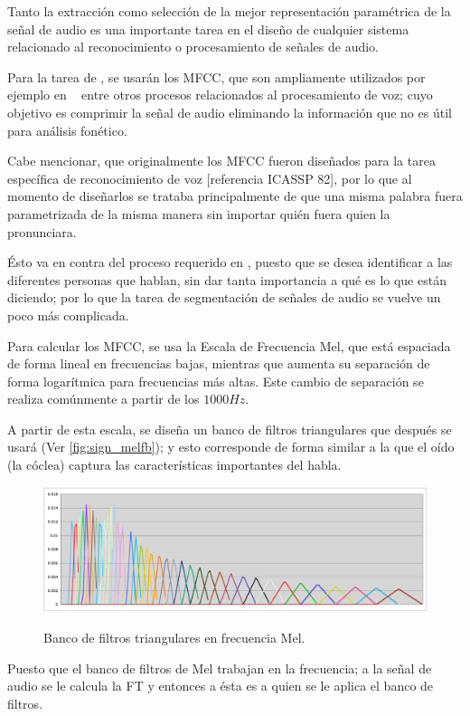 Tanto la extracción como selección de la mejor representación paramétrica de la señal de audio es una importante tarea en el diseño de cualquier sistema relacionado al reconocimiento o procesamiento de señales de audio. 

Para la tarea de \sd, se usarán los \ac{MFCC}, que son ampliamente utilizados por ejemplo en \sd~ entre otros procesos relacionados al procesamiento de voz; cuyo objetivo es comprimir la señal de audio eliminando la información que no es útil para análisis fonético.

Cabe mencionar, que originalmente los \ac{MFCC} fueron diseñados para la tarea específica de reconocimiento de voz [referencia ICASSP 82], por lo que al momento de diseñarlos se trataba principalmente de que una misma palabra fuera parametrizada de la misma manera sin importar quién fuera quien la pronunciara. 

Ésto va en contra del proceso requerido en \sd, puesto que se desea identificar a las diferentes personas que hablan, sin dar tanta importancia a qué es lo que están diciendo; por lo que la tarea de segmentación de señales de audio se vuelve un poco más complicada.

Para calcular los \ac{MFCC}, se usa la Escala de Frecuencia Mel, que está espaciada de forma lineal en frecuencias bajas, mientras que aumenta su separación de forma logarítmica para frecuencias más altas. Este cambio de separación se realiza comúnmente a partir de los $1000Hz$. 

A partir de esta escala, se diseña un banco de filtros triangulares que después se usará (Ver \autoref{fig:sign_melfb}); y esto corresponde de forma similar a la que el oído (la cóclea) captura las características importantes del habla. 

\begin{figure}[bth]
  \myfloatalign
  {\includegraphics[width=0.9\linewidth]{gfx/chap2/melfb}} \quad
  \caption{Banco de filtros triangulares en frecuencia Mel.}
  \label{fig:sign_melfb}
\end{figure}

Puesto que el banco de filtros de Mel trabajan en la frecuencia; a la señal de audio se le calcula la \ac{FT} y entonces a ésta es a quien se le aplica el banco de filtros.

